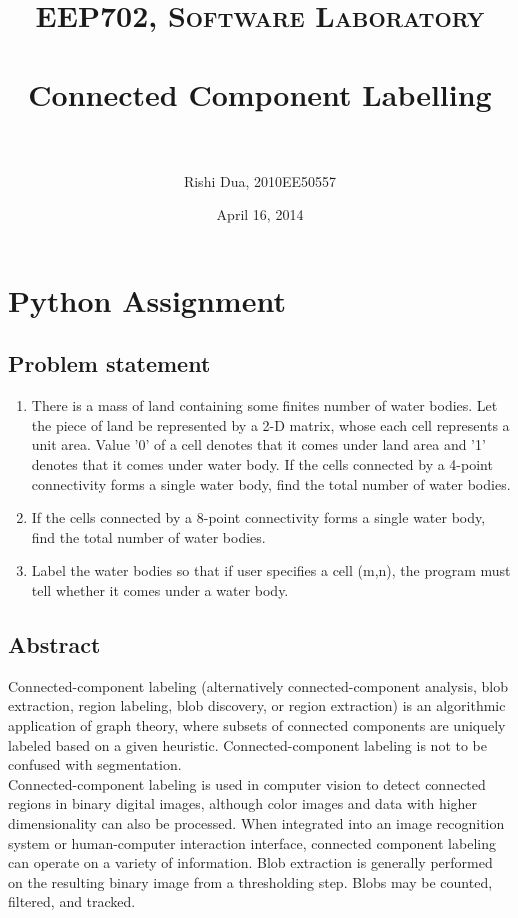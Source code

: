\documentclass[paper=a4, fontsize=11pt]{scrartcl} %
\title{	
\normalfont \normalsize 
\textsc{EEP702, Software Laboratory} \\ [25pt] %
\horrule{0.5pt} \\[0.4cm] %
\huge Connected Component Labelling \\ %
\horrule{2pt} \\[0.5cm] %
}
\author{Rishi Dua, 2010EE50557} %
\date{\normalsize April 16, 2014} %
\numberwithin{equation}{section} %
\numberwithin{figure}{section} %
\numberwithin{table}{section} %
\begin{document}
\maketitle %


\section{Python Assignment}


\subsection{Problem statement}
\begin {enumerate}
\item There is a mass of land containing some finites number of water bodies. Let the piece of land be represented by a 2-D matrix, whose each cell represents a unit area. Value '0' of a cell denotes
that it comes under land area and '1' denotes that it comes under water body. If the cells connected by a 4-point connectivity forms a single water body, find the total number of water bodies.
\item If the cells connected by a 8-point connectivity forms a single water body, find the total number of water bodies.
\item Label the water bodies so that if user specifies a cell (m,n), the program must tell whether it comes under a water body.
\end{enumerate}
\subsection{Abstract}

Connected-component labeling (alternatively connected-component analysis, blob extraction, region labeling, blob discovery, or region extraction) is an algorithmic application of graph theory, where subsets of connected components are uniquely labeled based on a given heuristic. Connected-component labeling is not to be confused with segmentation.\\

Connected-component labeling is used in computer vision to detect connected regions in binary digital images, although color images and data with higher dimensionality can also be processed. When integrated into an image recognition system or human-computer interaction interface, connected component labeling can operate on a variety of information. Blob extraction is generally performed on the resulting binary image from a thresholding step. Blobs may be counted, filtered, and tracked.\\
\end{document}
